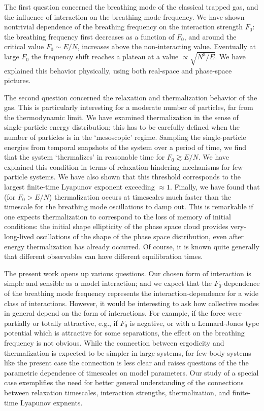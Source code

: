 \documentclass[a4paper, onecolumn]{revtex4-1}
\begin{document}
The first question concerned the breathing mode of the classical trapped gas, and the influence of
interaction on the breathing mode frequency.  We have shown nontrivial dependence of the breathing
frequency on the interaction strength $F_0$: the breathing frequency first decreases as a function
of $F_0$, and around the critical value $F_0 \sim E/N$, increases above the non-interacting value.
Eventually at large $F_0$ the frequency shift reaches a plateau at a value $\propto\sqrt{N^3/E}$.
We have explained this behavior physically, using both real-space and phase-space pictures.

The second question concerned the relaxation and thermalization behavior of the gas.  This is
particularly interesting for a moderate number of particles, far from the thermodynamic limit.  We
have examined thermalization in the sense of single-particle energy distribution; this has to be
carefully defined when the number of particles is in the `mesoscopic' regime.  Sampling the
single-particle energies from temporal snapshots of the system over a period of time, we find that
the system `thermalizes' in reasonable time for $F_0 \gtrsim E/N$.  We have explained this condition
in terms of relaxation-hindering mechanisms for few-particle systems.  We have also shown that this
threshold corresponds to the largest finite-time Lyapunov exponent exceeding $\approx1$.  Finally,
we have found that (for $F_0 > E/N$) thermalization occurs at timescales much faster than the
timescale for the breathing mode oscillations to damp out.  This is remarkable if one expects
thermalization to correspond to the loss of memory of initial conditions: the initial shape
ellipticity of the phase space cloud provides very-long-lived oscillations of the shape of the phase
space distribution, even after energy thermalization has already occurred.  
%
Of course, it is known quite generally that different observables can have different equilibration
times.

The present work opens up various questions.  Our chosen form of interaction is simple and sensible
as a model interaction; and we expect that the $F_0$-dependence of the breathing mode frequency
represents the interaction-dependence for a wide class of interactions.  However, it would be
interesting to ask how collective modes in general depend on the form of interactions.  For example,
if the force were partially or totally attractive, e.g., if $F_0$ is negative, or with a
Lennard-Jones type potential which is attractive for some separations, the effect on the breathing
frequency is not obvious.
%
While the connection between ergodicity and thermalization is expected to be simpler in large
systems, for few-body systems like the present case the connection is less clear and raises
questions of the the parametric dependence of timescales on model parameters.  Our study of a
special case exemplifies the need for better general understanding of the connections between
relaxation timescales, interaction strengths, thermalization, and finite-time Lyapunov expnents.
\end{document}
